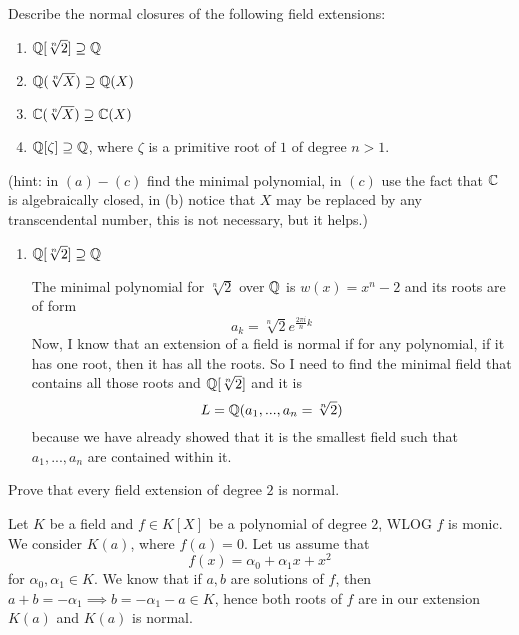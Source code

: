 \documentclass{article}
\begin{document}

\begin{problem}[2]{}
Describe the normal closures of the following field extensions:
\begin{enumerate}[label=(\alph*)]
    \item $\mathbb{Q}[\sqrt[n]{2}]\supseteq\mathbb{Q}$
    \item $\mathbb{Q}(\sqrt[n]{X})\supseteq\mathbb{Q}(X)$
    \item $\mathbb{C}(\sqrt[n]{X})\supseteq\mathbb{C}(X)$
    \item $\mathbb{Q}[\zeta]\supseteq\mathbb{Q}$, where $\zeta$ is a primitive root of $1$ of degree $n>1$.
\end{enumerate}
(hint: in $(a)-(c)$ find the minimal polynomial, in $(c)$ use the fact that $\mathbb{C}$ is algebraically closed, in (b) notice that $X$ may be replaced by any transcendental number, this is not necessary, but it helps.)
\end{problem}

\begin{enumerate}[label=(\alph*), leftmargin=*]
    \item $\mathbb{Q}[\sqrt[n]{2}]\supseteq\mathbb{Q}$

    The minimal polynomial for $\sqrt[n]{2}$ over $\mathbb{Q}$ is $w(x)=x^n-2$ and its roots are of form
    $$a_k=\sqrt[n]{2}e^{\frac{2\pi i}{n}k}$$
    Now, I know that an extension of a field is normal if for any polynomial, if it has one root, then it has all the roots. So I need to find the minimal field that contains all those roots and $\mathbb{Q}[\sqrt[n]{2}]$ and it is
    $$L=\mathbb{Q}(a_1,...,a_n=\sqrt[n]{2})$$
    because we have already showed that it is the smallest field such that $a_1,...,a_n$ are contained within it.
\end{enumerate}

\begin{problem}[3]{}
Prove that every field extension of degree $2$ is normal.
\end{problem}

Let $K$ be a field and $f\in K[X]$ be a polynomial of degree $2$, WLOG $f$ is monic. We consider $K(a)$, where $f(a)=0$. Let us assume that
$$f(x)=\alpha_0+\alpha_1x+x^2$$
for $\alpha_0,\alpha_1\in K$. We know that if $a,b$ are solutions of $f$, then $a+b=-\alpha_1\implies b=-\alpha_1-a\in K$, hence both roots of $f$ are in our extension $K(a)$ and $K(a)$ is normal.
\end{document}

